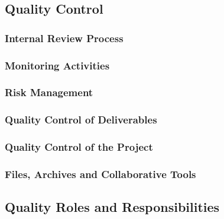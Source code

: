 \documentclass[
  11pt,
]{article}
\begin{document}
\hypertarget{quality-control-1}{%
\subsection{Quality Control}\label{quality-control-1}}

\hypertarget{internal-review-process}{%
\subsubsection{Internal Review Process}\label{internal-review-process}}

\hypertarget{monitoring-activities}{%
\subsubsection{Monitoring Activities}\label{monitoring-activities}}

\hypertarget{risk-management}{%
\subsubsection{Risk Management}\label{risk-management}}

\hypertarget{quality-control-of-deliverables}{%
\subsubsection{Quality Control of
Deliverables}\label{quality-control-of-deliverables}}

\hypertarget{quality-control-of-the-project}{%
\subsubsection{Quality Control of the
Project}\label{quality-control-of-the-project}}

\hypertarget{files-archives-and-collaborative-tools}{%
\subsubsection{Files, Archives and Collaborative
Tools}\label{files-archives-and-collaborative-tools}}

\hypertarget{quality-roles-and-responsibilities}{%
\subsection{Quality Roles and
Responsibilities}\label{quality-roles-and-responsibilities}}
\end{document}
